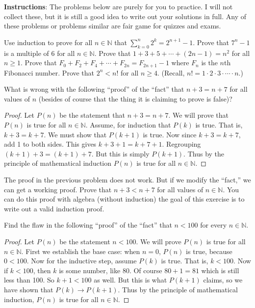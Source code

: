 \documentclass[10pt]{exam}
\def\d{\displaystyle}
\def\N{\mathbb{N}}
\def\imp{\rightarrow}
\begin{document}
\noindent \textbf{Instructions}: The problems below are purely for you to practice.  I will not collect these, but it is still a good idea to write out your solutions in full.  Any of these problems or problems similar are fair game for quizzes and exams.  

\begin{questions}
\question Use induction to prove for all $n \in \N$ that $\d\sum_{k=0}^n 2^k = 2^{n+1} - 1$.
\question Prove that $7^n - 1$ is a multiple of 6 for all $n \in \N$.
\question Prove that $1 + 3 + 5 + \cdots + (2n-1) = n^2$ for all $n \ge 1$.
\question Prove that $F_0 + F_2 + F_4 + \cdots + F_{2n} = F_{2n+1} - 1$ where $F_n$ is the $n$th Fibonacci number.
\question Prove that $2^n < n!$ for all $n \ge 4$.  (Recall, $n! = 1\cdot 2 \cdot 3 \cdot \cdots\cdot n$.)

\question What is wrong with the following ``proof'' of the ``fact'' that $n+3 = n+7$ for all values of $n$ (besides of course that the thing it is claiming to prove is false)? 
  \begin{proof}
    Let $P(n)$ be the statement that $n + 3 = n + 7$.  We will prove that $P(n)$ is true for all $n \in \N$.  Assume, for induction that $P(k)$ is true.  That is, $k+3 = k+7$.  We must show that $P(k+1)$ is true.  Now since $k + 3 = k + 7$, add 1 to both sides.  This gives $k + 3 + 1 = k + 7 + 1$.  Regrouping $(k+1) + 3 = (k+1) + 7$.  But this is simply $P(k+1)$.  Thus by the principle of mathematical induction $P(n)$ is true for all $n \in \N$.
  \end{proof}

\question The proof in the previous problem does not work.  But if we modify the ``fact,'' we can get a working proof.  Prove that $n + 3 < n + 7$ for all values of $n \in \N$.  You can do this proof with algebra (without induction) the goal of this exercise is to write out a valid induction proof.
  
\question  Find the flaw in the following ``proof'' of the ``fact'' that $n < 100$ for every $n \in \N$.
 \begin{proof}
  Let $P(n)$ be the statement $n < 100$.  We will prove $P(n)$ is true for all $n \in \N$. First we establish the base case: when $n = 0$, $P(n)$ is true, because $0 < 100$.  Now for the inductive step, assume $P(k)$ is true.  That is, $k < 100$.  Now if $k < 100$, then $k$ is some number, like 80.  Of course $80+1 = 81$ which is still less than 100.  So $k +1 < 100$ as well.  But this is what $P(k+1)$ claims, so we have shown that $P(k) \imp P(k+1)$.  Thus by the principle of mathematical induction, $P(n)$ is true for all $n \in \N$.
 \end{proof}


\end{questions}
\end{document}
